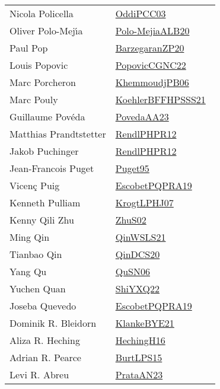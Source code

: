 {\begin{longtable}{p{4cm}p{20cm}}
Nicola Policella & \href{works/OddiPCC03.pdf}{OddiPCC03}~\cite{OddiPCC03}\\
Oliver Polo{-}Mej{\'{\i}}a & \href{works/Polo-MejiaALB20.pdf}{Polo-MejiaALB20}~\cite{Polo-MejiaALB20}\\
Paul Pop & \href{works/BarzegaranZP20.pdf}{BarzegaranZP20}~\cite{BarzegaranZP20}\\
Louis Popovic & \href{works/PopovicCGNC22.pdf}{PopovicCGNC22}~\cite{PopovicCGNC22}\\
Marc Porcheron & \href{works/KhemmoudjPB06.pdf}{KhemmoudjPB06}~\cite{KhemmoudjPB06}\\
Marc Pouly & \href{works/KoehlerBFFHPSSS21.pdf}{KoehlerBFFHPSSS21}~\cite{KoehlerBFFHPSSS21}\\
Guillaume Pov{\'{e}}da & \href{works/PovedaAA23.pdf}{PovedaAA23}~\cite{PovedaAA23}\\
Matthias Prandtstetter & \href{works/RendlPHPR12.pdf}{RendlPHPR12}~\cite{RendlPHPR12}\\
Jakob Puchinger & \href{works/RendlPHPR12.pdf}{RendlPHPR12}~\cite{RendlPHPR12}\\
Jean{-}Francois Puget & \href{works/Puget95.pdf}{Puget95}~\cite{Puget95}\\
Vicen{\c{c}} Puig & \href{works/EscobetPQPRA19.pdf}{EscobetPQPRA19}~\cite{EscobetPQPRA19}\\
Kenneth Pulliam & \href{works/KrogtLPHJ07.pdf}{KrogtLPHJ07}~\cite{KrogtLPHJ07}\\
Kenny Qili Zhu & \href{works/ZhuS02.pdf}{ZhuS02}~\cite{ZhuS02}\\
Ming Qin & \href{works/QinWSLS21.pdf}{QinWSLS21}~\cite{QinWSLS21}\\
Tianbao Qin & \href{works/QinDCS20.pdf}{QinDCS20}~\cite{QinDCS20}\\
Yang Qu & \href{works/QuSN06.pdf}{QuSN06}~\cite{QuSN06}\\
Yuchen Quan & \href{}{ShiYXQ22}~\cite{ShiYXQ22}\\
Joseba Quevedo & \href{works/EscobetPQPRA19.pdf}{EscobetPQPRA19}~\cite{EscobetPQPRA19}\\
Dominik R. Bleidorn & \href{works/KlankeBYE21.pdf}{KlankeBYE21}~\cite{KlankeBYE21}\\
Aliza R. Heching & \href{works/HechingH16.pdf}{HechingH16}~\cite{HechingH16}\\
Adrian R. Pearce & \href{works/BurtLPS15.pdf}{BurtLPS15}~\cite{BurtLPS15}\\
Levi R. Abreu & \href{works/PrataAN23.pdf}{PrataAN23}~\cite{PrataAN23}\\

\end{longtable}}
